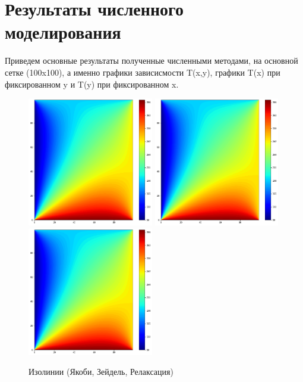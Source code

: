 \documentclass[20pt]{article}
\begin{document}
\section{Результаты численного моделирования}
    Приведем основные результаты полученные численными методами, на основной сетке (100x100), а именно графики зависисмости T(x,y), графики T(x) при фиксированном y и T(y) при фиксированном x. 
    \newpage
    \begin{figure}[h!]
        \centering
        \includegraphics[width=55mm]{jacobi.png}
        \includegraphics[width=55mm]{seidel.png}
        \includegraphics[width=55mm]{relax.png}
        \caption{Изолинии (Якоби, Зейдель, Релаксация)}
        \label{setup}
    \end{figure}
\end{document}
